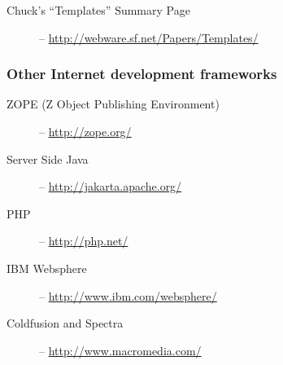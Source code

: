 \begin{description}
\item[Chuck's ``Templates'' Summary Page] -- \url{http://webware.sf.net/Papers/Templates/}
\end{description}

\subsubsection{Other Internet development frameworks}
\label{links.other}

\begin{description}
\item[ZOPE (Z Object Publishing Environment)] -- \url{http://zope.org/}
\item[Server Side Java] -- \url{http://jakarta.apache.org/}
\item[PHP] -- \url{http://php.net/}
\item[IBM Websphere] -- \url{http://www.ibm.com/websphere/}
\item[Coldfusion and Spectra] -- \url{http://www.macromedia.com/}
\end{description}
